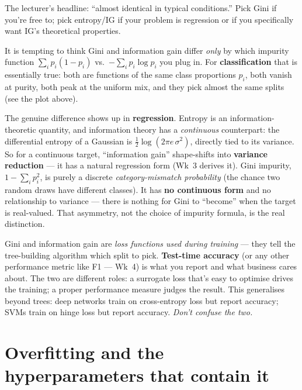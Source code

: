 \documentclass[11pt, a4paper]{article}
\begin{document}
The lecturer's headline: ``almost identical in typical conditions.'' Pick Gini if you're free to; pick entropy/IG if your problem is regression or if you specifically want IG's theoretical properties.

\begin{trapbox}
It is tempting to think Gini and information gain differ \emph{only} by which impurity function $\sum_i p_i(1-p_i)$ vs.\ $-\sum_i p_i\log p_i$ you plug in. For \textbf{classification} that is essentially true: both are functions of the same class proportions $p_i$, both vanish at purity, both peak at the uniform mix, and they pick almost the same splits (see the plot above).

The genuine difference shows up in \textbf{regression}. Entropy is an information-theoretic quantity, and information theory has a \emph{continuous} counterpart: the differential entropy of a Gaussian is $\tfrac12\log(2\pi e\,\sigma^2)$, directly tied to its variance. So for a continuous target, ``information gain'' shape-shifts into \textbf{variance reduction} — it has a natural regression form (Wk~3 derives it). Gini impurity, $1-\sum_i p_i^2$, is purely a discrete \emph{category-mismatch probability} (the chance two random draws have different classes). It has \textbf{no continuous form} and no relationship to variance — there is nothing for Gini to ``become'' when the target is real-valued. That asymmetry, not the choice of impurity formula, is the real distinction.
\end{trapbox}

\begin{pitfallbox}
Gini and information gain are \emph{loss functions used during training} — they tell the tree-building algorithm which split to pick. \textbf{Test-time accuracy} (or any other performance metric like F1 — Wk~4) is what you report and what business cares about. The two are different roles: a surrogate loss that's easy to optimise drives the training; a proper performance measure judges the result. This generalises beyond trees: deep networks train on cross-entropy loss but report accuracy; SVMs train on hinge loss but report accuracy. \emph{Don't confuse the two.}
\end{pitfallbox}

\section{Overfitting and the hyperparameters that contain it}
\end{document}
